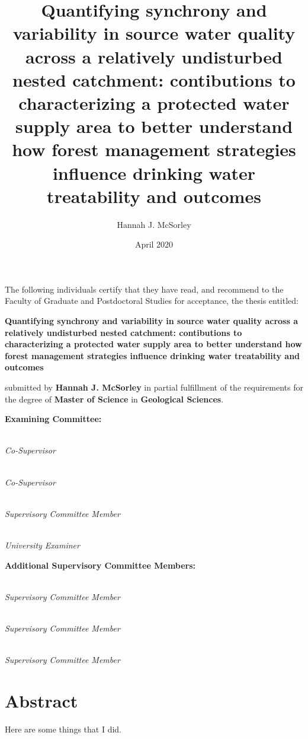 \documentclass[
  oneside]{ubcthesis}
\title{Quantifying synchrony and variability in source water quality across a relatively undisturbed nested catchment: contibutions to characterizing a protected water supply area to better understand how forest management strategies influence drinking water treatability and outcomes}
\author{Hannah J. McSorley}
\date{April 2020}
\begin{document}
\maketitle


\noindent The following individuals certify that they have read,
and recommend to the Faculty of Graduate and Postdoctoral Studies
for acceptance, the thesis entitled:

\begin{center}
{\large \textbf{Quantifying synchrony and variability in source water quality across a relatively undisturbed nested catchment: contibutions to characterizing a protected water supply area to better understand how forest management strategies influence drinking water treatability and outcomes}}
\end{center}

submitted by \textbf{Hannah J. McSorley} in partial fulfillment of the requirements for the degree of \textbf{Master of Science} in \textbf{Geological Sciences}.%
\par\bigskip%

\noindent\textbf{Examining Committee:}%
\par\medskip{}\\\emph{Co-Supervisor}
\par\medskip{}\\\emph{Co-Supervisor}
\par\medskip\noindent{}\\\emph{Supervisory Committee Member}
\par\medskip\noindent{}\\\emph{University Examiner}
\par\bigskip%
\noindent\textbf{Additional Supervisory Committee Members:}%
\par\medskip\noindent{}\\\emph{Supervisory Committee Member}
\par\medskip\noindent{}\\\emph{Supervisory Committee Member}
\par\medskip\noindent{}\\\emph{Supervisory Committee Member}
\cleardoublepage

\chapter{Abstract}

Here are some things that I did.
\end{document}
